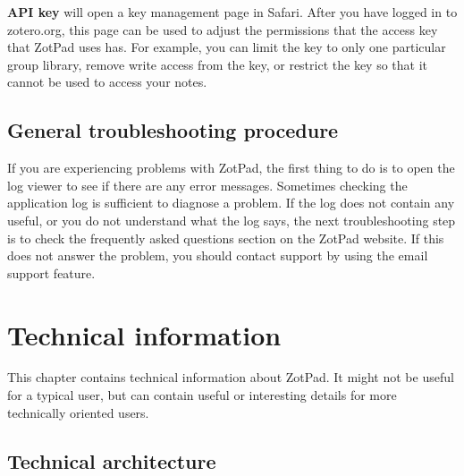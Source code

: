 \documentclass[oneside, openany, 12pt]{tufte-book}
\newcommand{\ipad}[1]{}
\newcommand{\ipad}[1]{#1}
\begin{document}
\textbf{\ipad{Manage }API key} will open a key management page in Safari. After you have logged in to zotero.org, this page can be used to adjust the permissions that the access key that ZotPad uses has. For example, you can limit the key to only one particular group library, remove write access from the key, or restrict the key so that it cannot be used to access your notes.

\section{General troubleshooting procedure}

If you are experiencing problems with ZotPad, the first thing to do is to open the log viewer to see if there are any error messages. Sometimes checking the application log is sufficient to diagnose a problem. If the log does not contain any useful, or you do not understand what the log says, the next troubleshooting step is to check the frequently asked questions section on the ZotPad website. If this does not answer the problem, you should contact support by using the email support feature.


\chapter{Technical information}

This chapter contains technical information about ZotPad. It might not be useful for a typical user, but can contain useful or interesting details for more technically oriented users. 

	\section{Technical architecture}
\label{sect:architecture}
\end{document}
